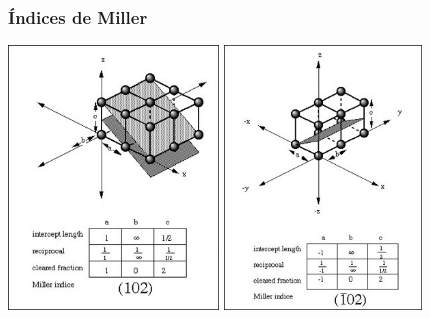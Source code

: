 \documentclass[10pt,t,aspectratio=169]{beamer}
\begin{document}
\begin{frame}[t]
\begin{columns}
\begin{column}{0.35\textwidth}
    \end{column}
    
  \end{columns}
  
\end{frame}


\begin{frame}[t]
  \frametitle{Índices de Miller}

  \centering
  \includegraphics[height=7cm]{./figures/miller102.jpg}
  \includegraphics[height=7cm]{./figures/millern102.jpg}
\end{frame}
\end{document}
